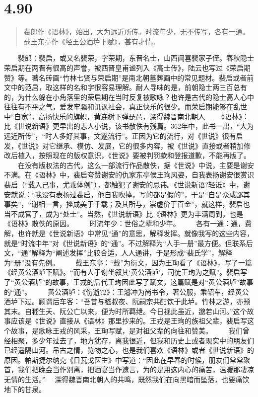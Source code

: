 \documentclass[]{book}
\begin{document}
\section{4.90}\label{section-267}

\begin{quote}
裴郎作《语林》，始出，大为远近所传。时流年少，无不传写，各有一通。载王东亭作《经王公酒垆下赋》，甚有才情。
\end{quote}

　　裴郎：裴启，或又名裴荣，字荣期，东晋名士，山西闻喜裴家子侄。春秋隐士荣启期在两晋有很高的声誉，被西晋皇甫谧列入《高士传》，陆云也写过《荣启期赞》等。著名砖画``竹林七贤与荣启期''是南北朝墓葬画中的常见题材。裴启或者前文中的范启，取这样的名和字很容易理解。耐人寻味的是，前朝隐士两三百总有的，为什么躲在小角落里的荣启期在当时反复被歌咏？也许是古代的隐士高人心中往往有不平之气，爱发牢骚和讥讽社会，真正快乐的很少。而荣启期能够在乱世中``自宽''，高扬快乐的旗帜，黄连树下弹琵琶，深得魏晋南北朝人
　　《语林》：比《世说新语》更早出的志人小说，该书散佚有残篇。362年中，此书一出，``大为远近所传''，``时人多好其事，文遂流行''。正因为它的流行，对《世说》很有启发，《世说》对它继承、模仿、发展，它的很多内容，被《世说》直接或者稍加修改后植入，按照现在的版权意识，《世说》要被判罚款和登报道歉，不能再版了。
　　在没有版权法的古代，这么一部流行作品散佚，据《世说》中说，主要是谢安不满。在《语林》中，裴启夸赞谢安的仇家东亭侯王珣风姿，自我表扬谢安很赏识裴启（``载入己事，尤乖体例''），都触犯了谢安的忌讳。《世说新语?轻诋》中，谢安就说：``我没有表扬过裴启，他自我吹捧，写的都是假的''，于是``自是众咸鄙其事矣''，``谢相一言，挫成美于千载；及其所与，崇虚价于百金''，就这样，裴启也当不成官了，成为``处士''。当然，《世说新语》比《语林》更为丰满周到，也是《语林》散佚的原因。
　　时流年少：世俗之辈和少年。
　　各有一通：通，费解，也许就是《世说新语》中常见``通''的意思，解释发挥。就像我写的这些内容，就是``时流中年''对《世说新语》的``通''。不过解释为``人手一册''最方便。但联系后文，``通''解释为``阐述发挥''比较合适，人人通讲，于是形成``裴氏学''，解释为``册''没有先例。
　　载王东亭：``载''为衍文，因为王珣看了《语林》，写了一篇《经黄公酒垆下赋》。``而有人于谢坐叙其`黄公酒垆'，司徒王珣为之赋''。裴启写了``黄公酒垆''的故事，王戎的后代王珣因此写了赋文，这篇赋是对``黄公酒垆''故事的``通''。
　　黄公酒垆：《伤逝?2》：王濬冲为尚书令，著公服，乘轺车，经黄公酒垆下过。顾谓后车客：``吾昔与嵇叔夜、阮嗣宗共酣饮于此垆。竹林之游，亦预其末。自嵇生夭、阮公亡以来，便为时所羁绁。今日视此虽近，邈若山河。''这个故事应该是《世说》直接从《语林》那里抄来的。王戎是王珣的族祖父辈，裴启写这个故事，是歌咏王戎的风采，王珣写赋，是对祖父辈的向往和赞美。
　　我们曾经相聚，多少年过去了，地方犹存，离我很近，但我和历史上或者现实中的朋友们已经遥隔山河。吊古之情，览物之心，也是我们喜欢《语林》或者《世说新语》的原因。帕斯捷尔纳克《日瓦戈医生》中写道：``因此在早春的时候，朋友们常常聚首，我们把晚会当作别离，把酒宴当作遗言，为的是用这内心的痛苦，温暖那凄凉无情的生活。''
　深得魏晋南北朝人的共鸣，既然我们在向黑暗而坠落，也要痛饮地下的甘泉。
\end{document}

